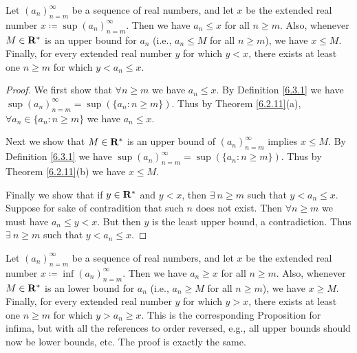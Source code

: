 \setcounter{theorem}{5}
\begin{proposition}\label{6.3.6}
    Let \((a_n)_{n = m}^\infty\) be a sequence of real numbers, and let \(x\) be the extended real number \(x \coloneqq \sup(a_n)_{n = m}^\infty\).
    Then we have \(a_n \leq x\) for all \(n \geq m\).
    Also, whenever \(M \in \mathbf{R}^*\) is an upper bound for \(a_n\) (i.e., \(a_n \leq M\) for all \(n \geq m\)), we have \(x \leq M\).
    Finally, for every extended real number \(y\) for which \(y < x\), there exists at least one \(n \geq m\) for which \(y < a_n \leq x\).
\end{proposition}

\begin{proof}
    We first show that \(\forall n \geq m\) we have \(a_n \leq x\).
    By Definition \ref{6.3.1} we have \(\sup(a_n)_{n = m}^\infty = \sup(\{a_n : n \geq m\})\).
    Thus by Theorem \ref{6.2.11}(a), \(\forall a_n \in \{a_n : n \geq m\}\) we have \(a_n \leq x\).

    Next we show that \(M \in \mathbf{R}^*\) is an upper bound of \((a_n)_{n = m}^\infty\) implies \(x \leq M\).
    By Definition \ref{6.3.1} we have \(\sup(a_n)_{n = m}^\infty = \sup(\{a_n : n \geq m\})\).
    Thus by Theorem \ref{6.2.11}(b) we have \(x \leq M\).

    Finally we show that if \(y \in \mathbf{R}^*\) and \(y < x\), then \(\exists\ n \geq m\) such that \(y < a_n \leq x\).
    Suppose for sake of contradition that such \(n\) does not exist.
    Then \(\forall n \geq m\) we must have \(a_n \leq y < x\).
    But then \(y\) is the least upper bound, a contradiction.
    Thus \(\exists\ n \geq m\) such that \(y < a_n \leq x\).
\end{proof}

\begin{remark}\label{6.3.7}
    Let \((a_n)_{n = m}^\infty\) be a sequence of real numbers, and let \(x\) be the extended real number \(x \coloneqq \inf(a_n)_{n = m}^\infty\).
    Then we have \(a_n \geq x\) for all \(n \geq m\).
    Also, whenever \(M \in \mathbf{R}^*\) is an lower bound for \(a_n\) (i.e., \(a_n \geq M\) for all \(n \geq m\)), we have \(x \geq M\).
    Finally, for every extended real number \(y\) for which \(y > x\), there exists at least one \(n \geq m\) for which \(y > a_n \geq x\).
    This is the corresponding Proposition for infima, but with all the references to order reversed, e.g., all upper bounds should now be lower bounds, etc.
    The proof is exactly the same.
\end{remark}

